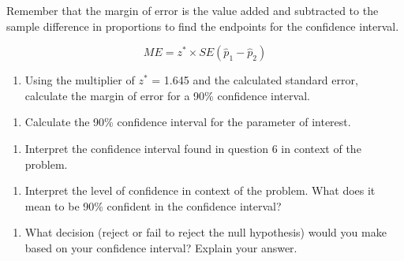 \documentclass[
]{report}
\providecommand{\tightlist}{%
  \setlength{\itemsep}{0pt}\setlength{\parskip}{0pt}}
\begin{document}
\vspace{1mm}

\newpage

Remember that the margin of error is the value added and subtracted to the sample difference in proportions to find the endpoints for the confidence interval.

\[ME = z^*\times SE(\hat{p}_1 - \hat{p}_2)\]

\begin{enumerate}
\def\labelenumi{\arabic{enumi}.}
\setcounter{enumi}{4}
\tightlist
\item
  Using the multiplier of \(z^*\) = 1.645 and the calculated standard error, calculate the margin of error for a 90\% confidence interval.
\end{enumerate}

\vspace{0.8in}

\begin{enumerate}
\def\labelenumi{\arabic{enumi}.}
\setcounter{enumi}{5}
\tightlist
\item
  Calculate the 90\% confidence interval for the parameter of interest.
\end{enumerate}

\vspace{1in}

\begin{enumerate}
\def\labelenumi{\arabic{enumi}.}
\setcounter{enumi}{6}
\tightlist
\item
  Interpret the confidence interval found in question 6 in context of the problem.
\end{enumerate}

\vspace{1in}

\begin{enumerate}
\def\labelenumi{\arabic{enumi}.}
\setcounter{enumi}{7}
\tightlist
\item
  Interpret the level of confidence in context of the problem. What does it mean to be 90\% confident in the confidence interval?
\end{enumerate}

\vspace{1in}

\begin{enumerate}
\def\labelenumi{\arabic{enumi}.}
\setcounter{enumi}{8}
\tightlist
\item
  What decision (reject or fail to reject the null hypothesis) would you make based on your confidence interval? Explain your answer.
  \vspace{0.5in}
  \newpage
\end{enumerate}
\end{document}
